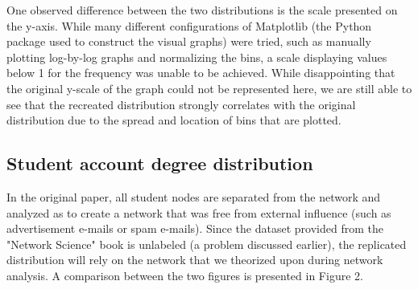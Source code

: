\documentclass[11pt]{article}
\begin{document}
\begin{multicols}{2}
One observed difference between the two distributions is the scale presented on the y-axis. While many different configurations of Matplotlib (the Python package used to construct the visual graphs) were tried, such as manually plotting log-by-log graphs and normalizing the bins, a scale displaying values below 1 for the frequency was unable to be achieved. While disappointing that the original y-scale of the graph could not be represented here, we are still able to see that the recreated distribution strongly correlates with the original distribution due to the spread and location of bins that are plotted.

\subsection{Student account degree distribution}
\hspace*{\parindent}In the original paper, all student nodes are separated from the network and analyzed as to create a network that was free from external influence (such as advertisement e-mails or spam e-mails). Since the dataset provided from the "Network Science" book is unlabeled (a problem discussed earlier), the replicated distribution will rely on the network that we theorized upon during network analysis. A comparison between the two figures is presented in Figure 2.


\end{multicols}
\end{document}
